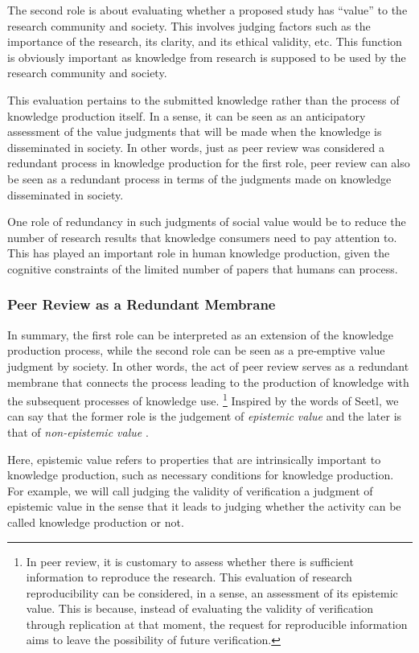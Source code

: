 \documentclass{book}
\begin{document}
The second role is about evaluating whether a proposed study has ``value'' to the research community and society. This involves judging factors such as the importance of the research, its clarity, and its ethical validity, etc. This function is obviously important as knowledge from research is supposed to be used by the research community and society.

This evaluation pertains to the submitted knowledge rather than the process of knowledge production itself. In a sense, it can be seen as an anticipatory assessment of the value judgments that will be made when the knowledge is disseminated in society. In other words, just as peer review was considered a redundant process in knowledge production for the first role, peer review can also be seen as a redundant process in terms of the judgments made on knowledge disseminated in society.

One role of redundancy in such judgments of social value would be to reduce the number of research results that knowledge consumers need to pay attention to. This has played an important role in human knowledge production, given the cognitive constraints of the limited number of papers that humans can process.

\subsubsection{Peer Review as a Redundant Membrane}

In summary, the first role can be interpreted as an extension of the knowledge production process, while the second role can be seen as a pre-emptive value judgment by society. In other words, the act of peer review serves as a redundant membrane that connects the process leading to the production of knowledge with the subsequent processes of knowledge use. \footnote{
In peer review, it is customary to assess whether there is sufficient information to reproduce the research. This evaluation of research reproducibility can be considered, in a sense, an assessment of its epistemic value. This is because, instead of evaluating the validity of verification through replication at that moment, the request for reproducible information aims to leave the possibility of future verification.
} Inspired by the words of Seetl, we can say that the former role is the judgement of \textit{epistemic value} and the later is that of \textit{non-epistemic value} \cite{steel2010epistemic}. 

Here, epistemic value refers to properties that are intrinsically important to knowledge production, such as necessary conditions for knowledge production. For example, we will call judging the validity of verification a judgment of epistemic value in the sense that it leads to judging whether the activity can be called knowledge production or not. 
\end{document}
